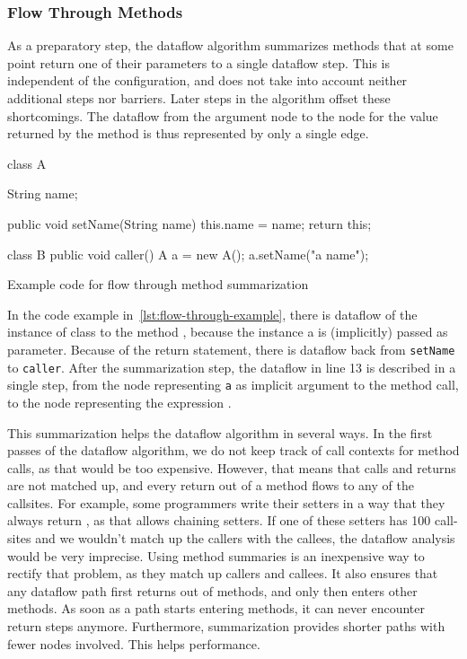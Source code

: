 \subsubsection*{Flow Through Methods}
As a preparatory step, the dataflow algorithm summarizes methods that at some point 
return one of their parameters to a single dataflow step.
This is independent of the configuration, and does not take into account
neither additional steps nor barriers.
Later steps in the algorithm offset these shortcomings.
The dataflow from the argument node to the node for the value returned by
the method is thus represented by only a single edge.
\begin{listing}[H]
    \begin{javacode}
class A {
    String name;

    public void setName(String name) {
        this.name = name;
        return this;
    }
}

class B {
    public void caller() {
        A a = new A();
        a.setName("a name");
    }
}
    \end{javacode}
    \caption{Example code for flow through method summarization}    
    \label{lst:flow-through-example}
\end{listing}
In the code example in~\autoref{lst:flow-through-example}, there is dataflow of the instance
of class  to the method , because the instance a 
is (implicitly) passed as  parameter.
Because of the return statement, there is dataflow back from \texttt{setName} to
\texttt{caller}.
After the summarization step, the dataflow in line 13 is described in a single step,
from the node representing \texttt{a} as implicit argument to the method call, to the node 
representing the expression .

This summarization helps the dataflow algorithm in several ways.
In the first passes of the dataflow algorithm, we do not keep track of call contexts
for method calls, as that would be too expensive.
However, that means that calls and returns are not matched up, and every return out of 
a method flows to any of the callsites.
For example, some programmers write their setters in a way that they always return ,
as that allows chaining setters.
If one of these setters has 100 call-sites and we wouldn't match up the callers with the callees,
the dataflow analysis would be very imprecise.
Using method summaries is an inexpensive way
to rectify that problem, as they match up callers and callees.
It also ensures that any dataflow path first returns out of methods, and only
then enters other methods. As soon as a path starts entering methods, it can 
never encounter return steps anymore.
Furthermore, summarization provides shorter paths with fewer nodes involved.
This helps performance.

